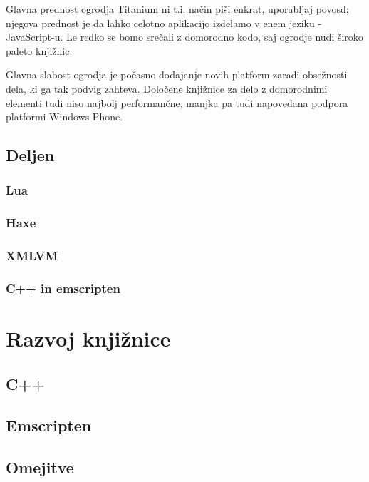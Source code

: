 Glavna prednost ogrodja Titanium ni t.i. način piši enkrat, uporabljaj povosd; njegova prednost je da lahko celotno aplikacijo izdelamo v enem jeziku - JavaScript-u. Le redko se bomo srečali z domorodno kodo, saj ogrodje nudi široko paleto knjižnic.

Glavna slabost ogrodja je počasno dodajanje novih platform zaradi obsežnosti dela, ki ga tak podvig zahteva. Določene knjižnice za delo z domorodnimi elementi tudi niso najbolj performančne, manjka pa tudi napovedana podpora platformi Windows Phone.

\section{Deljen}

\subsection{Lua}

\subsection{Haxe}

\subsection{XMLVM}

\subsection{C++ in emscripten}

\chapter{Razvoj knjižnice}
\label{chap:development}

\section{C++}

\section{Emscripten}

\section{Omejitve}

